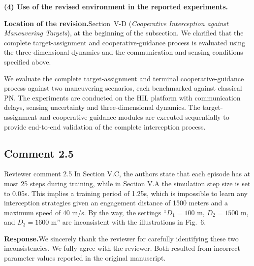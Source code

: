 \documentclass[11pt]{article}
\newcommand{\hladd}[1]{{\color{addblue}#1}}
\newcommand{\rsp}{\medskip\noindent\textbf{Response.}\quad}
\newcommand{\loc}{\medskip\noindent\textbf{Location of the revision.}\quad}
\begin{document}
\medskip
\noindent\textbf{(4) Use of the revised environment in the reported
experiments.}

\loc Section~V-D (\emph{Cooperative Interception against Maneuvering
Targets}), at the beginning of the subsection. We clarified that the complete
target-assignment and cooperative-guidance process is evaluated using the
three-dimensional dynamics and the communication and sensing conditions
specified above.

\begin{tcolorbox}[enhanced,breakable,colback=white,colframe=addblue!55,
boxrule=0.6pt,arc=2pt,left=9pt,right=9pt,top=7pt,bottom=7pt]
\hladd{We evaluate the complete target-assignment and terminal
cooperative-guidance process} against two maneuvering scenarios, each
benchmarked against classical PN.
\hladd{The experiments are conducted on the HIL platform with communication
delays, sensing uncertainty and three-dimensional dynamics. The
target-assignment and cooperative-guidance modules are executed sequentially
to provide end-to-end validation of the complete interception process.}
\end{tcolorbox}








\subsection*{Comment 2.5}

\begin{reviewercomment}{Reviewer comment 2.5}
In Section V.C, the authors state that each episode has at most 25 steps
during training, while in Section V.A the simulation step size is set to
0.05s. This implies a training period of 1.25s, which is impossible to learn
any interception strategies given an engagement distance of 1500 meters and
a maximum speed of 40 m/s. By the way, the settings ``$D_1=100$ m,
$D_2=1500$ m, and $D_3=1600$ m'' are inconsistent with the illustrations
in Fig.~6.
\end{reviewercomment}

\rsp We sincerely thank the reviewer for carefully identifying these two
inconsistencies. We fully agree with the reviewer. Both resulted from
incorrect parameter values reported in the original manuscript.
\end{document}

